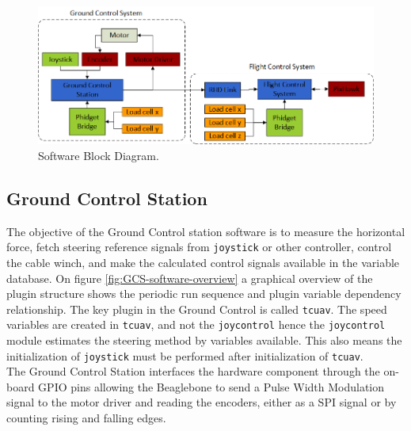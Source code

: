 \begin{figure}[hbtp]
\centering
\includegraphics[scale=0.8]{graphics/Visio/block-diagram1.png}
\caption{Software Block Diagram.}
\label{fig:software-block-diagram}
\end{figure}


\subsection{Ground Control Station}
The objective of the Ground Control station software is to measure the horizontal force, fetch steering reference signals from \texttt{joystick} or other controller, control the cable winch, and make the calculated control signals available in the variable database. On figure \ref{fig:GCS-software-overview} a graphical overview of the plugin structure shows the periodic run sequence and plugin variable dependency relationship. The key plugin in the Ground Control is called \texttt{tcuav}. The speed variables are created in \texttt{tcuav}, and not the \texttt{joycontrol} hence the \texttt{joycontrol} module estimates the steering method by variables available. This also means the initialization of \texttt{joystick} must be performed after initialization of \texttt{tcuav}. \\
\noindent
The Ground Control Station interfaces the hardware component through the on-board GPIO pins allowing the Beaglebone to send a Pulse Width Modulation signal to the motor driver and reading the encoders, either as a SPI signal or by counting rising and falling edges.



